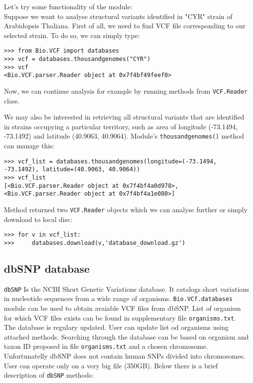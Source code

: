 \noindent Let's try some functionality of the module:\\

\noindent Suppose we want to analyse structural variants identified in "CYR" strain of Arabidopsis Thaliana. First of all,
we need to find VCF file corresponding to our selected strain. To do so, we can simply type:


\begin{verbatim}
>>> from Bio.VCF import databases
>>> vcf = databases.thousandgenomes("CYR")
>>> vcf
<Bio.VCF.parser.Reader object at 0x7f4bf49feef0>

\end{verbatim}


\noindent Now, we can continue analysis for example by running methods from \verb|VCF.Reader| class.


\noindent We may also be interested in retrieving all structural variants that are identified in strains occupying a particular
territory, such as area of longitude (-73.1494, -73.1492) and latitude (40.9063, 40.9064). Module's \verb|thousandgenomes()|
method can manage this:


\begin{verbatim}
>>> vcf_list = databases.thousandgenomes(longitude=(-73.1494, -73.1492), latitude=(40.9063, 40.9064))
>>> vcf_list
[<Bio.VCF.parser.Reader object at 0x7f4bf4a0d978>, <Bio.VCF.parser.Reader object at 0x7f4bf4a1e080>]

\end{verbatim}


\noindent Method returned two \verb|VCF.Reader| objects which we can analyse further or simply download to local disc:


\begin{verbatim}
>>> for v in vcf_list:
>>>     databases.download(v,'database_download.gz')
\end{verbatim}

\subsection{dbSNP database}

\verb|dbSNP| Is the NCBI Short Genetic Variations database. It catalogs short variations in nucleotide sequences from a wide range of organisms. 
\verb|Bio.VCf.databases| module can be used to obtain avaiable VCF files from dbSNP. List of organism for which VCF files exists can be found in supplementary file \verb|organisms.txt|. The database is regulary updated. User can update list od organisms using attached methods. Searching through the database can be based on organism and taxon ID proposed in file \verb|organisms.txt| and a chosen chromosome. Unfortunatelly dbSNP does not contain human SNPs divided into chromosomes. User can operate only on a very big file (350GB).
\vspace{5mm}
\noindent Below there is a brief description of \verb|dbSNP| methods:

